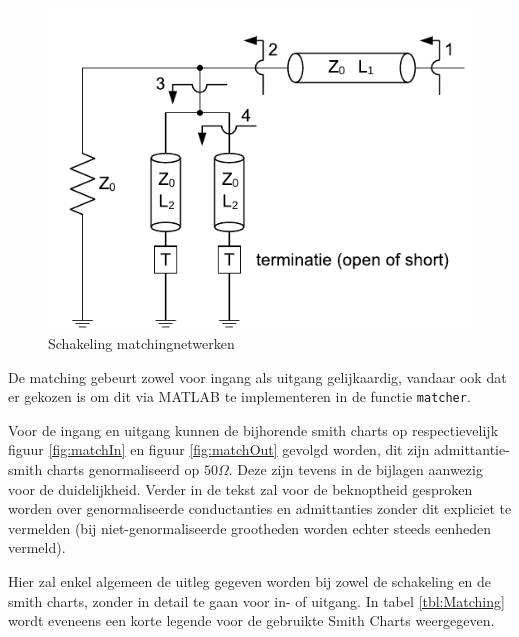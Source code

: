   \begin{figure}[!hb]
    \centering
    \includegraphics[keepaspectratio=true]{fig/matching.pdf}
    \caption{Schakeling matchingnetwerken}
    \label{fig:schakelingMatch}
  \end{figure}

  De matching gebeurt zowel voor ingang als uitgang gelijkaardig, vandaar ook
  dat er gekozen is om dit via MATLAB te implementeren in de functie \texttt{matcher}.

  Voor de ingang en uitgang kunnen de bijhorende smith charts op respectievelijk
  figuur \ref{fig:matchIn} en figuur \ref{fig:matchOut} gevolgd worden, dit
  zijn admittantie-smith charts genormaliseerd op $50 \Omega$. Deze zijn
  tevens in de bijlagen aanwezig voor de duidelijkheid. Verder in de tekst
  zal voor de beknoptheid gesproken worden over genormaliseerde conductanties
  en admittanties zonder dit expliciet te vermelden (bij niet-genormaliseerde
  grootheden worden echter steeds eenheden vermeld).

  Hier zal enkel algemeen de uitleg gegeven worden bij zowel de schakeling en de smith charts, zonder in
  detail te gaan voor in- of uitgang. In tabel \ref{tbl:Matching} wordt eveneens
  een korte legende voor de gebruikte Smith Charts weergegeven.

